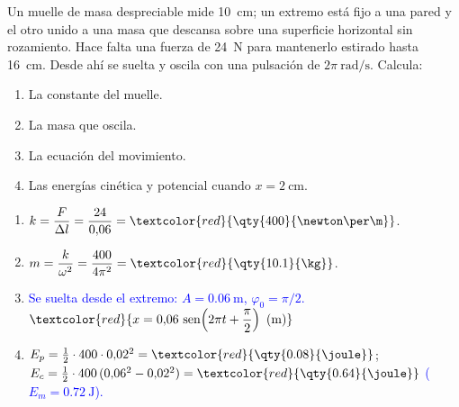 \begin{exercise}
    Un muelle de masa despreciable mide \qty{10}{\cm}; un extremo está fijo a una pared y el otro unido a una masa que
    descansa sobre una superficie horizontal sin rozamiento. Hace falta una fuerza de \qty{24}{\newton} para mantenerlo
    estirado hasta \qty{16}{\cm}. Desde ahí se suelta y oscila con una pulsación de \(2\pi\ \unit{\radian\per\second}\). Calcula:
    \begin{enumerate}[label=\letraminuscula]
        \item La constante del muelle.
        \item La masa que oscila.
        \item La ecuación del movimiento.
        \item Las energías cinética y potencial cuando \(x = \qty{2}{\cm}\).
    \end{enumerate}
    \begin{solu}
        \begin{enumerate}[label=\letraminuscula]
            \item \(k = \dfrac{F}{\Delta l} = \dfrac{24}{0{,}06} = \textcolor{red}{\qty{400}{\newton\per\m}}\).
            \item \(m = \dfrac{k}{\omega^2} = \dfrac{400}{4\pi^2} = \textcolor{red}{\qty{10.1}{\kg}}\).
            \item \textcolor{blue}{Se suelta desde el extremo: \(A = \qty{0.06}{\m}\), \(\varphi_0 = \pi/2\).} \(\textcolor{red}{x = 0{,}06\,\sen\!\left(2\pi t + \dfrac{\pi}{2}\right)\ \text{(m)}}\)
            \item \(E_p = \frac{1}{2}\cdot 400\cdot 0{,}02^2 = \textcolor{red}{\qty{0.08}{\joule}}\);
            \(E_c = \frac{1}{2}\cdot 400\,(0{,}06^2 - 0{,}02^2) = \textcolor{red}{\qty{0.64}{\joule}}\) \textcolor{blue}{(\(E_m = \qty{0.72}{\joule}\)).}
        \end{enumerate}
    \end{solu}
\end{exercise}

